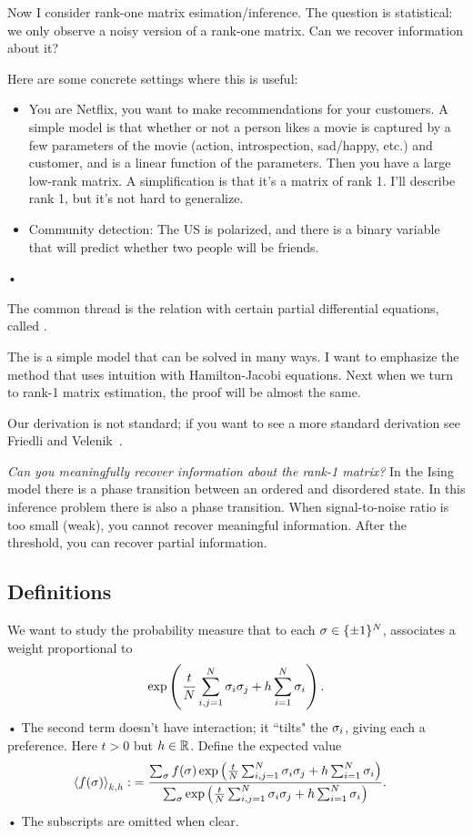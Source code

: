 
Now I consider rank-one matrix esimation/inference. The question is statistical: we only observe a noisy version of a rank-one matrix. Can we recover information about it?

Here are some concrete settings where this is useful:
\begin{itemize}
\item
You are Netflix, you want to make recommendations for your customers. A simple model is that whether or not a person likes a movie is captured by a few parameters of the movie (action, introspection, sad/happy, etc.) and customer, and is a linear function of the parameters. Then you have a large low-rank matrix. A simplification is that it's a matrix of rank 1. I'll describe rank 1, but it's not hard to generalize. 
\item
Community detection: The US is polarized, and there is a binary variable that will predict whether two people will be friends.
\end{itemize}•

The common thread is the relation with certain partial differential equations, called .

The  is a simple model that can be solved in many ways. I want to emphasize the method that uses intuition with Hamilton-Jacobi equations. Next when we turn to rank-1 matrix estimation, the proof will be almost the same. 

Our derivation is not standard; if you want to see a more standard derivation see Friedli and Velenik~\cite{friedli2017statistical}.

\emph{Can you meaningfully recover information about the rank-1 matrix?} In the Ising model there is a phase transition between an ordered and disordered state. In this inference problem there is also a phase transition. When signal-to-noise ratio is too small (weak), you cannot recover meaningful information. After the threshold, you can recover partial information. 



\subsection{Definitions}

We want to study the probability measure that to each $\sigma\in \{\pm1\}^N$, associates a weight proportional to 
\begin{align*}
\exp\left( {\frac{t}{N} \sum_{i,j=1}^{N} \sigma_i\sigma_j + h\sum_{i=1}^{N} \sigma_i} \right).
\end{align*}•
The second term doesn't have interaction; it ``tilts" the $\sigma_i$, giving each a preference. Here $t>0$ but $h\in \mathbb{R}$.
Define the expected value
\begin{align*}
\left\langle {f(\sigma)}\right\rangle_{k,h} :&= \frac{\sum_\sigma f(\sigma) \exp\left( {\frac{t}{N} \sum_{i,j=1}^{N} \sigma_i\sigma_j + h\sum_{i=1}^{N} \sigma_i} \right)}{\sum_\sigma \exp\left( {\frac{t}{N} \sum_{i,j=1}^{N} \sigma_i\sigma_j + h\sum_{i=1}^{N} \sigma_i} \right)}.
\end{align*}•
The subscripts are omitted when clear.

